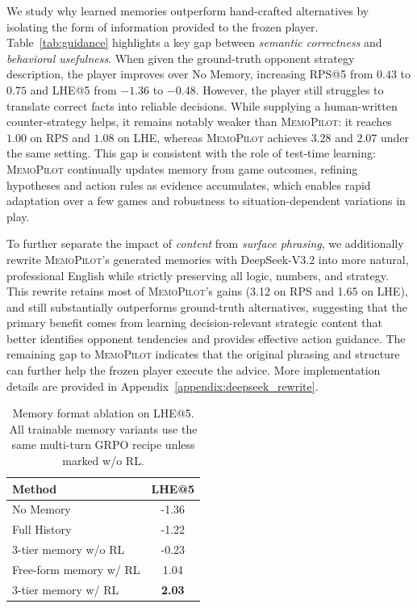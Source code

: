 \documentclass{article}
\newcommand{\methodname}{MemoPilot}
\newcommand{\method}{\textsc{\methodname}}
\theoremstyle{plain}
\theoremstyle{definition}
\theoremstyle{remark}
\begin{document}
We study why learned memories outperform hand-crafted alternatives by isolating the form of information provided to the frozen player. Table~\ref{tab:guidance} highlights a key gap between \emph{semantic correctness} and \emph{behavioral usefulness}. When given the ground-truth opponent strategy description, the player improves over No Memory, increasing RPS@5 from $0.43$ to $0.75$ and LHE@5 from $-1.36$ to $-0.48$. However, the player still struggles to translate correct facts into reliable decisions. While supplying a human-written counter-strategy helps, it remains notably weaker than \method{}: it reaches $1.00$ on RPS and $1.08$ on LHE, whereas \method{} achieves $3.28$ and $2.07$ under the same setting. This gap is consistent with the role of test-time learning: \method{} continually updates memory from game outcomes, refining hypotheses and action rules as evidence accumulates, which enables rapid adaptation over a few games and robustness to situation-dependent variations in play.

To further separate the impact of \emph{content} from \emph{surface phrasing}, we additionally rewrite \method{}'s generated memories with DeepSeek-V3.2 into more natural, professional English while strictly preserving all logic, numbers, and strategy. This rewrite retains most of \method{}'s gains (3.12 on RPS and 1.65 on LHE), and still substantially outperforms ground-truth alternatives, suggesting that the primary benefit comes from learning decision-relevant strategic content that better identifies opponent tendencies and provides effective action guidance. The remaining gap to \method{} indicates that the original phrasing and structure can further help the frozen player execute the advice. More implementation details are provided in Appendix~\ref{appendix:deepseek_rewrite}.

\begin{table}[t]
\centering
\caption{Memory format ablation on LHE@5. All trainable memory variants use the same multi-turn GRPO recipe unless marked w/o RL.}
\label{tab:memory_format}
\small
\begin{tabular}{@{}lc@{}}
\toprule
\textbf{Method} & \textbf{LHE@5} \\
\midrule
No Memory & -1.36 \\
Full History & -1.22 \\
3-tier memory w/o RL & -0.23 \\
Free-form memory w/ RL & 1.04 \\
3-tier memory w/ RL & \textbf{2.03} \\
\bottomrule
\end{tabular}
\end{table}
\end{document}
